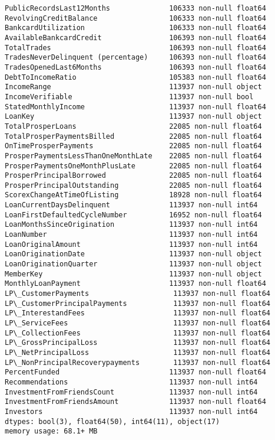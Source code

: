 \documentclass[11pt]{article}
\begin{document}
\begin{Verbatim}[commandchars=\\\{\}]
PublicRecordsLast12Months              106333 non-null float64
RevolvingCreditBalance                 106333 non-null float64
BankcardUtilization                    106333 non-null float64
AvailableBankcardCredit                106393 non-null float64
TotalTrades                            106393 non-null float64
TradesNeverDelinquent (percentage)     106393 non-null float64
TradesOpenedLast6Months                106393 non-null float64
DebtToIncomeRatio                      105383 non-null float64
IncomeRange                            113937 non-null object
IncomeVerifiable                       113937 non-null bool
StatedMonthlyIncome                    113937 non-null float64
LoanKey                                113937 non-null object
TotalProsperLoans                      22085 non-null float64
TotalProsperPaymentsBilled             22085 non-null float64
OnTimeProsperPayments                  22085 non-null float64
ProsperPaymentsLessThanOneMonthLate    22085 non-null float64
ProsperPaymentsOneMonthPlusLate        22085 non-null float64
ProsperPrincipalBorrowed               22085 non-null float64
ProsperPrincipalOutstanding            22085 non-null float64
ScorexChangeAtTimeOfListing            18928 non-null float64
LoanCurrentDaysDelinquent              113937 non-null int64
LoanFirstDefaultedCycleNumber          16952 non-null float64
LoanMonthsSinceOrigination             113937 non-null int64
LoanNumber                             113937 non-null int64
LoanOriginalAmount                     113937 non-null int64
LoanOriginationDate                    113937 non-null object
LoanOriginationQuarter                 113937 non-null object
MemberKey                              113937 non-null object
MonthlyLoanPayment                     113937 non-null float64
LP\_CustomerPayments                    113937 non-null float64
LP\_CustomerPrincipalPayments           113937 non-null float64
LP\_InterestandFees                     113937 non-null float64
LP\_ServiceFees                         113937 non-null float64
LP\_CollectionFees                      113937 non-null float64
LP\_GrossPrincipalLoss                  113937 non-null float64
LP\_NetPrincipalLoss                    113937 non-null float64
LP\_NonPrincipalRecoverypayments        113937 non-null float64
PercentFunded                          113937 non-null float64
Recommendations                        113937 non-null int64
InvestmentFromFriendsCount             113937 non-null int64
InvestmentFromFriendsAmount            113937 non-null float64
Investors                              113937 non-null int64
dtypes: bool(3), float64(50), int64(11), object(17)
memory usage: 68.1+ MB

    \end{Verbatim}
\end{document}
